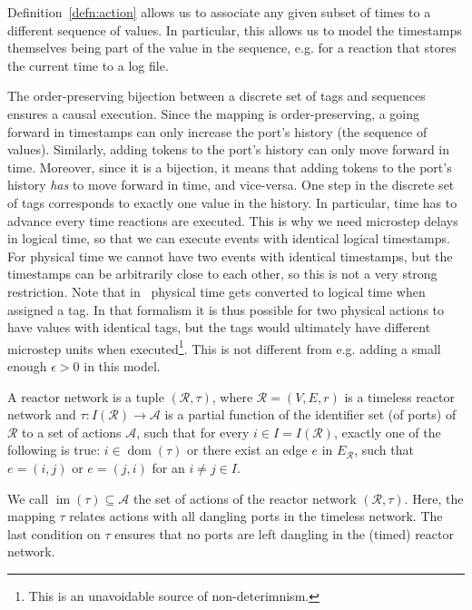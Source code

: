 Definition~\ref{defn:action} allows us to associate any given subset of times to a different sequence of values.
In particular, this allows us to model the timestamps themselves being part of the value in the sequence, e.g. for a reaction that stores the current time to a log file.

The order-preserving bijection between a discrete set of tags and sequences ensures a causal execution.
Since the mapping is order-preserving, a going forward in timestamps can only increase the port's history (the sequence of values).
Similarly, adding tokens to the port's history can only move forward in time. 
Moreover, since it is a bijection, it means that adding tokens to the port's history \emph{has} to move forward in time, and vice-versa.
One step in the discrete set of tags corresponds to exactly one value in the history.
In particular, time has to advance every time reactions are executed. 
This is why we need microstep delays in logical time, so that we can execute events with identical logical timestamps.
For physical time we cannot have two events with identical timestamps, but the timestamps can be arbitrarily close to each other, so this is not a very strong restriction.
Note that in~\cite{lohstroh_phdthesis} physical time gets converted to logical time when assigned a tag. 
In that formalism it is thus possible for two physical actions to have values with identical tags, but the tags would ultimately have different microstep units when executed\footnote{This is an unavoidable source of non-deterimnism.}.
This is not different from e.g. adding a small enough $\epsilon > 0$ in this model.

\begin{defn}
    \label{defn:reactor_network}
    A reactor network is a tuple $(\mathcal{R},\tau)$, where $\mathcal{R} = (V,E,r)$ is a timeless reactor network and $\tau : I(\mathcal{R}) \rightarrow \mathcal{A}$ is a partial function of the identifier set (of ports) of $\mathcal{R}$ to a set of actions $\mathcal{A}$, such that 
    for every $i \in I = I(\mathcal{R})$, exactly one of the following is true: $i \in \operatorname{dom}(\tau)$ or there exist an edge $e$ in $E_{\mathcal{R}}$, such that $e = (i,j)$ or $e = (j,i)$ for an $i \neq j \in I$.
\end{defn}

We call $\operatorname{im}(\tau) \subseteq \mathcal{A}$ the set of actions of the reactor network $(\mathcal{R},\tau)$.
Here, the mapping $\tau$ relates actions with all dangling ports in the timeless network.
The last condition on $\tau$ ensures that no ports are left dangling in the (timed) reactor network.

